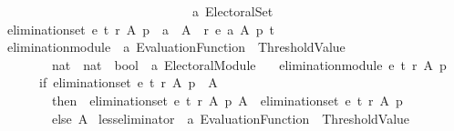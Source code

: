 \begin{isabellebody}
\ \ \ \ \ \ \ \ \ \ \ \ \ \ \ \ \ \ \ \ \ \ \ \ \ \ \ \ \ \ {\isacharprime}{\kern0pt}a\ Electoral{\isacharunderscore}{\kern0pt}Set{\isachardoublequoteclose}\ \isanewline
\ {\isachardoublequoteopen}elimination{\isacharunderscore}{\kern0pt}set\ e\ t\ r\ A\ p\ {\isacharequal}{\kern0pt}\ {\isacharbraceleft}{\kern0pt}a\ {\isasymin}\ A\ {\isachardot}{\kern0pt}\ r\ {\isacharparenleft}{\kern0pt}e\ a\ A\ p{\isacharparenright}{\kern0pt}\ t\ {\isacharbraceright}{\kern0pt}{\isachardoublequoteclose}\isanewline
\isanewline
{}\isamarkupfalse%
\ elimination{\isacharunderscore}{\kern0pt}module\ {\isacharcolon}{\kern0pt}{\isacharcolon}{\kern0pt}\ {\isachardoublequoteopen}{\isacharprime}{\kern0pt}a\ Evaluation{\isacharunderscore}{\kern0pt}Function\ {\isasymRightarrow}\ Threshold{\isacharunderscore}{\kern0pt}Value\ {\isasymRightarrow}\isanewline
\ \ \ \ \ \ \ \ {\isacharparenleft}{\kern0pt}nat\ {\isasymRightarrow}\ nat\ {\isasymRightarrow}\ bool{\isacharparenright}{\kern0pt}\ {\isasymRightarrow}\ {\isacharprime}{\kern0pt}a\ Electoral{\isacharunderscore}{\kern0pt}Module{\isachardoublequoteclose}\ \isanewline
\ \ {\isachardoublequoteopen}elimination{\isacharunderscore}{\kern0pt}module\ e\ t\ r\ A\ p\ {\isacharequal}{\kern0pt}\isanewline
\ \ \ \ \ \ {\isacharparenleft}{\kern0pt}if\ {\isacharparenleft}{\kern0pt}elimination{\isacharunderscore}{\kern0pt}set\ e\ t\ r\ A\ p{\isacharparenright}{\kern0pt}\ {\isasymnoteq}\ A\isanewline
\ \ \ \ \ \ \ \ then\ {\isacharparenleft}{\kern0pt}{\isacharbraceleft}{\kern0pt}{\isacharbraceright}{\kern0pt}{\isacharcomma}{\kern0pt}\ {\isacharparenleft}{\kern0pt}elimination{\isacharunderscore}{\kern0pt}set\ e\ t\ r\ A\ p{\isacharparenright}{\kern0pt}{\isacharcomma}{\kern0pt}\ A\ {\isacharminus}{\kern0pt}\ {\isacharparenleft}{\kern0pt}elimination{\isacharunderscore}{\kern0pt}set\ e\ t\ r\ A\ p{\isacharparenright}{\kern0pt}{\isacharparenright}{\kern0pt}\isanewline
\ \ \ \ \ \ \ \ else\ {\isacharparenleft}{\kern0pt}{\isacharbraceleft}{\kern0pt}{\isacharbraceright}{\kern0pt}{\isacharcomma}{\kern0pt}{\isacharbraceleft}{\kern0pt}{\isacharbraceright}{\kern0pt}{\isacharcomma}{\kern0pt}A{\isacharparenright}{\kern0pt}{\isacharparenright}{\kern0pt}{\isachardoublequoteclose}%
\isadelimdocument
%
\endisadelimdocument
%
\isatagdocument
%
\isamarkuptrue%
%
\endisatagdocument
{\isafolddocument}%
%
\isadelimdocument
%
\endisadelimdocument
{}\isamarkupfalse%
\ less{\isacharunderscore}{\kern0pt}eliminator\ {\isacharcolon}{\kern0pt}{\isacharcolon}{\kern0pt}\ {\isachardoublequoteopen}{\isacharprime}{\kern0pt}a\ Evaluation{\isacharunderscore}{\kern0pt}Function\ {\isasymRightarrow}\ Threshold{\isacharunderscore}{\kern0pt}Value\ {\isasymRightarrow}\isanewline

\end{isabellebody}
